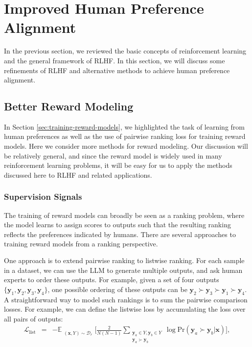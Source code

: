 
\section{Improved Human Preference Alignment}

\noindent In the previous section, we reviewed the basic concepts of reinforcement learning and the general framework of RLHF. In this section, we will discuss some refinements of RLHF and alternative methods to achieve human preference alignment.

\subsection{Better Reward Modeling}
\label{sec:better-reward-modeling}

\noindent In Section \ref{sec:training-reward-models}, we highlighted the task of learning from human preferences as well as the use of pairwise ranking loss for training reward models. Here we consider more methods for reward modeling. Our discussion will be relatively general, and since the reward model is widely used in many reinforcement learning problems, it will be easy for us to apply the methods discussed here to RLHF and related applications.

\subsubsection{Supervision Signals}

\noindent The training of reward models can broadly be seen as a ranking problem, where the model learns to assign scores to outputs such that the resulting ranking reflects the preferences indicated by humans. There are several approaches to training reward models from a ranking perspective.

One approach is to extend pairwise ranking to listwise ranking. For each sample in a dataset, we can use the LLM to generate multiple outputs, and ask human experts to order these outputs. For example, given a set of four outputs $\{\mathbf{y}_1,\mathbf{y}_2,\mathbf{y}_3,\mathbf{y}_4\}$, one possible ordering of these outputs can be $\mathbf{y}_2 \succ \mathbf{y}_3 \succ \mathbf{y}_1 \succ \mathbf{y}_4$. A straightforward way to model such rankings is to sum the pairwise comparison losses. For example, we can define the listwise loss by accumulating the loss over all pairs of outputs:
\begin{eqnarray}
\mathcal{L}_{\mathrm{list}} & = & -\mathbb{E}_{\substack{(\mathbf{x},Y) \sim \mathcal{D}_r}} \Big[ \frac{2}{N(N-1)} \sum_{\substack{\mathbf{y}_a \in Y, \mathbf{y}_b \in Y\\ \mathbf{y}_a \succ \mathbf{y}_b}} \log \mathrm{Pr}(\mathbf{y}_a \succ \mathbf{y}_b | \mathbf{x}) \Big],
\end{eqnarray}

